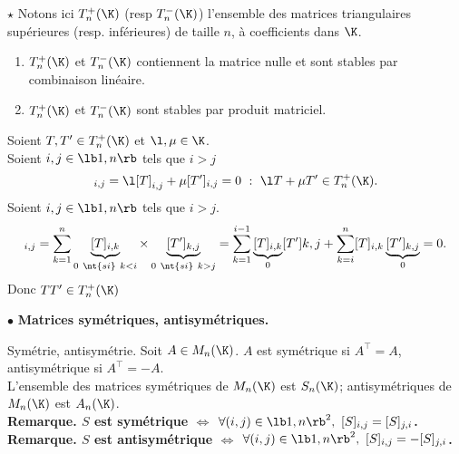 \documentclass[11pt]{article}
\begin{document}
\begin{prop}{$\star$}{}
    Notons ici $T_n^+(\K)$ (resp $T_n^-(\K)$) l'ensemble des matrices triangulaires supérieures (resp. inférieures) de taille $n$, à coefficients dans $\K$.
    \begin{enumerate}
        \item $T_n^+(\K)$ et $T_n^-(\K)$ contiennent la matrice nulle et sont stables par combinaison linéaire.
        \item $T_n^+(\K)$ et $T_n^-(\K)$ sont stables par produit matriciel.
    \end{enumerate}
    \tcblower
    Soient $T,T'\in T_n^+(\K)$ et $\l,\mu\in\K$.\\
     Soient $i,j\in\lb1,n\rb$ tels que $i>j$
    \begin{equation*}
        [\l T + \mu T']_{i,j}=\l[T]_{i,j}+\mu[T']_{i,j}=0~:~\l T + \mu T'\in T_n^+(\K).
    \end{equation*}
    \boxed{\star} Soient $i,j\in\lb1,n\rb$ tels que $i>j$.
    \begin{equation*}
        [TT']_{i,j}=\sum_{k=1}^n\underbrace{[T]_{i,k}}_{0~\nt{si}~k<i}\times\underbrace{[T']_{k,j}}_{0~\nt{si}~k>j}=\sum_{k=1}^{i-1}\underbrace{[T]_{i,k}}_{0}[T']{k,j}+\sum_{k=i}^n[T]_{i,k}\underbrace{[T']_{k,j}}_{0}=0.
    \end{equation*}
    Donc $TT'\in T_n^+(\K)$
\end{prop}

$\bullet$ \bf{Matrices symétriques, antisymétriques.}

\begin{defi}{Symétrie, antisymétrie.}{}
    Soit $A\in M_n(\K)$. $A$ est symétrique si $A^\top=A$, antisymétrique si $A^\top=-A$.\\
    L'ensemble des matrices symétriques de $M_n(\K)$ est $S_n(\K)$; antisymétriques de $M_n(\K)$ est $A_n(\K)$.\\
    \bf{Remarque.} $S$ est symétrique $\iff$ $\forall(i,j)\in\lb1,n\rb^2, ~ [S]_{i,j}=[S]_{j,i}$.\\
    \bf{Remarque.} $S$ est antisymétrique $\iff$ $\forall (i,j)\in\lb1,n\rb^2, ~ [S]_{i,j}=-[S]_{j,i}$.
\end{defi}
\end{document}
